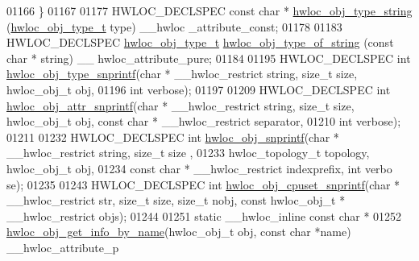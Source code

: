 \begin{DoxyCode}
01166 \}
01167 
01177 HWLOC\_DECLSPEC \textcolor{keyword}{const} \textcolor{keywordtype}{char} * \hyperlink{a00048_ga7c61920feca6fd9006d930dabfc09058}{hwloc_obj_type_string} (\hyperlink{a00041_gacd37bb612667dc437d66bfb175a8dc55}{hwloc_obj_type_t} type) \_\_hwloc
      \_attribute\_const;
01178 
01183 HWLOC\_DECLSPEC \hyperlink{a00041_gacd37bb612667dc437d66bfb175a8dc55}{hwloc_obj_type_t} \hyperlink{a00048_gade722091ae392fdc79557e797a16c370}{hwloc_obj_type_of_string} (\textcolor{keyword}{const} \textcolor{keywordtype}{char} * \textcolor{keywordtype}{string}) \_\_
      hwloc\_attribute\_pure;
01184 
01195 HWLOC\_DECLSPEC \textcolor{keywordtype}{int} \hyperlink{a00048_ga3ad856e8f3487d340c82a23b8a2a0351}{hwloc_obj_type_snprintf}(\textcolor{keywordtype}{char} * \_\_hwloc\_restrict \textcolor{keywordtype}{string}, \textcolor{keywordtype}{size\_t
      } size, hwloc\_obj\_t obj,
01196                                    \textcolor{keywordtype}{int} verbose);
01197 
01209 HWLOC\_DECLSPEC \textcolor{keywordtype}{int} \hyperlink{a00048_ga0db8286d7f3ceda8defd76e3e1e2b284}{hwloc_obj_attr_snprintf}(\textcolor{keywordtype}{char} * \_\_hwloc\_restrict \textcolor{keywordtype}{string}, \textcolor{keywordtype}{size\_t
      } size, hwloc\_obj\_t obj, \textcolor{keyword}{const} \textcolor{keywordtype}{char} * \_\_hwloc\_restrict separator,
01210                                    \textcolor{keywordtype}{int} verbose);
01211 
01232 HWLOC\_DECLSPEC \textcolor{keywordtype}{int} \hyperlink{a00048_ga5c6a61a83f4790b421e2f62e9088446f}{hwloc_obj_snprintf}(\textcolor{keywordtype}{char} * \_\_hwloc\_restrict \textcolor{keywordtype}{string}, \textcolor{keywordtype}{size\_t} size
      ,
01233                              hwloc\_topology\_t topology, hwloc\_obj\_t obj,
01234                              \textcolor{keyword}{const} \textcolor{keywordtype}{char} * \_\_hwloc\_restrict indexprefix, \textcolor{keywordtype}{int} verbo
      se);
01235 
01243 HWLOC\_DECLSPEC \textcolor{keywordtype}{int} \hyperlink{a00048_gabbfb92224c992c0e2ecef6b6e45260f2}{hwloc_obj_cpuset_snprintf}(\textcolor{keywordtype}{char} * \_\_hwloc\_restrict str, \textcolor{keywordtype}{size\_t} 
      size, \textcolor{keywordtype}{size\_t} nobj, \textcolor{keyword}{const} hwloc\_obj\_t * \_\_hwloc\_restrict objs);
01244 
01251 \textcolor{keyword}{static} \_\_hwloc\_inline \textcolor{keyword}{const} \textcolor{keywordtype}{char} *
01252 \hyperlink{a00048_ga2a12b2450489675bd5759dc47cbc51ed}{hwloc_obj_get_info_by_name}(hwloc\_obj\_t obj, \textcolor{keyword}{const} \textcolor{keywordtype}{char} *name) \_\_hwloc\_attribute\_p

\end{DoxyCode}
